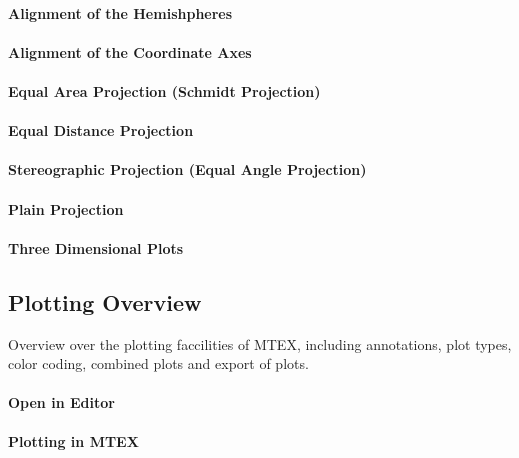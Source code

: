 \documentclass{article}
\begin{document}
			\paragraph{Alignment of the Hemishpheres}
		
			\paragraph{Alignment of the Coordinate Axes}
		
			\paragraph{Equal Area Projection (Schmidt Projection)}
		
			\paragraph{Equal Distance Projection}
		
			\paragraph{Stereographic Projection (Equal Angle Projection)}
		
			\paragraph{Plain Projection}
		
			\paragraph{Three Dimensional Plots}
		
		\subsection{Plotting Overview}

		
                     \begin{par}
Overview over the plotting faccilities of MTEX, including annotations, plot types, color coding, combined plots and export of plots.
\end{par} \vspace{1em}

                  
			\paragraph{Open in Editor}
		
			\paragraph{Plotting in MTEX}
		
\end{document}
